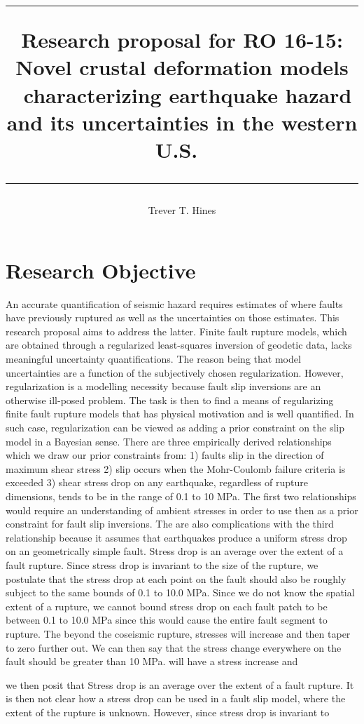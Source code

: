 \documentclass[12pt]{article}
\title{	
 \rule{\headwidth}{1.0pt}
 Research proposal for RO 16-15:
 Novel crustal deformation models \
 characterizing earthquake hazard and its uncertainties in the western U.S.\
 \rule{\headwidth}{1.0pt}
 \author{Trever T. Hines}}
\begin{document}
\maketitle

\section*{Research Objective}
An accurate quantification of seismic hazard requires estimates of where faults have previously ruptured as well as the uncertainties on those estimates.  This research proposal aims to address the latter. Finite fault rupture models, which are obtained through a regularized least-squares inversion of geodetic data, lacks meaningful uncertainty quantifications.  The reason being that model uncertainties are a function of the subjectively chosen regularization.  However, regularization is a modelling necessity because fault slip inversions are an otherwise ill-posed problem.  The task is then to find a means of regularizing finite fault rupture models that has physical motivation and is well quantified.  In such case, regularization can be viewed as adding a prior constraint on the slip model in a Bayesian sense.  There are three empirically derived relationships which we draw our prior constraints from: 1) faults slip in the direction of maximum shear stress 2) slip occurs when the Mohr-Coulomb failure criteria is exceeded 3) shear stress drop on any earthquake, regardless of rupture dimensions, tends to be in the range of 0.1 to 10 MPa.  The first two relationships would require an understanding of ambient stresses in order to use then as a prior constraint for fault slip inversions.  The are also complications with the third relationship because it assumes that earthquakes produce a uniform stress drop on an geometrically simple fault.  Stress drop is an average over the extent of a fault rupture. Since stress drop is invariant to the size of the rupture, we postulate that the stress drop at each point on the fault should also be roughly subject to the same bounds of 0.1 to 10.0 MPa.  Since we do not know the spatial extent of a rupture, we cannot bound stress drop on each fault patch to be between 0.1 to 10.0 MPa since this would cause the entire fault segment to rupture.  The beyond the  coseismic rupture, stresses will increase and then taper to zero further out.  We can then say that the stress change everywhere on the fault should be greater than 10 MPa. will have a stress increase and   


we then posit that Stress drop is an average over the extent of a fault rupture.  It is then not clear how a stress drop can be used in a fault slip model, where the extent of the rupture is unknown.  However, since stress drop is invariant to 
\end{document}
